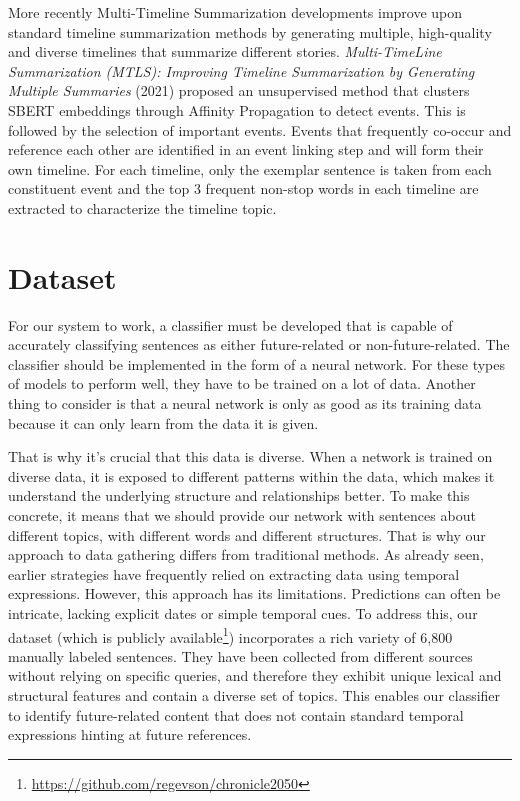 \documentclass[a4paper,10pt]{report}
\begin{document}
More recently Multi-Timeline Summarization developments improve upon standard timeline summarization methods by generating multiple, high-quality and diverse timelines that summarize different stories. \textit{Multi-TimeLine Summarization (MTLS): Improving Timeline Summarization by Generating Multiple Summaries} (2021) \cite{YuMultiTimeline} proposed an unsupervised method that clusters SBERT embeddings through Affinity Propagation to detect events. This is followed by the selection of important events. Events that frequently co-occur and reference each other are identified in an event linking step and will form their own timeline. For each timeline, only the exemplar sentence is taken from each constituent event and the top 3 frequent non-stop words in each timeline are extracted to characterize the timeline topic.



\chapter{Dataset}
For our system to work, a classifier must be developed that is capable of accurately classifying sentences as either future-related or non-future-related. The classifier should be implemented in the form of a neural network. For these types of models to perform well, they have to be trained on a lot of data. Another thing to consider is that a neural network is only as good as its training data because it can only learn from the data it is given. 

That is why it's crucial that this data is diverse. When a network is trained on diverse data, it is exposed to different patterns within the data, which makes it understand the underlying structure and relationships better. \cite{GoodfellowDeepLearning} To make this concrete, it means that we should provide our network with sentences about different topics, with different words and different structures. That is why our approach to data gathering differs from traditional methods. As already seen, earlier strategies have frequently relied on extracting data using temporal expressions. However, this approach has its limitations. Predictions can often be intricate, lacking explicit dates or simple temporal cues. To address this, our dataset (which is publicly available\footnote{\url{https://github.com/regevson/chronicle2050}}) incorporates a rich variety of 6,800 manually labeled sentences. They have been collected from different sources without relying on specific queries, and therefore they exhibit unique lexical and structural features and contain a diverse set of topics. This enables our classifier to identify future-related content that does not contain standard temporal expressions hinting at future references.
\end{document}
